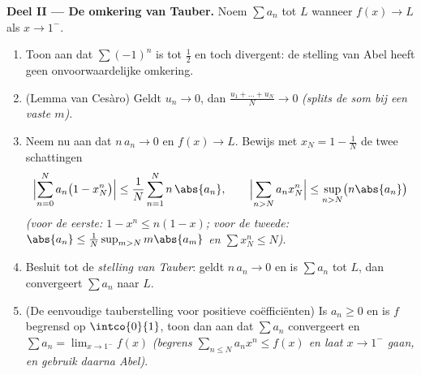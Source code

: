 \begin{problem}
\medskip
\noindent\textbf{Deel II --- De omkering van Tauber.} Noem $\sum
a_n$ \emph{} tot $L$ wanneer $f(x) \to L$ als $x
\to 1^-$.
\begin{enumerate}[resume]
  \item Toon aan dat $\sum (-1)^n$  is tot
        $\frac12$ en toch divergent: de stelling van Abel heeft
        geen onvoorwaardelijke omkering.
  \item (Lemma van Cesàro) Geldt $u_n \to 0$, dan $\frac{u_1 +
        \dots + u_N}{N} \to 0$ \emph{(splits de som bij een vaste
        $m$)}.
  \item Neem nu aan dat $n\,a_n \to 0$ en $f(x) \to L$. Bewijs met
        $x_N = 1 - \frac1N$ de twee schattingen
        \[
        \Bigl|\sum_{n=0}^{N} a_n\bigl(1 - x_N^n\bigr)\Bigr|
        \leq \frac{1}{N}\sum_{n=1}^{N} n\,\abs{a_n},
        \qquad
        \Bigl|\sum_{n>N} a_n x_N^n\Bigr|
        \leq \sup_{n>N}\bigl(n\abs{a_n}\bigr)
        \]
        \emph{(voor de eerste: $1 - x^n \leq n(1-x)$; voor de
        tweede: $\abs{a_n} \leq \frac{1}{N}\sup_{m>N} m\abs{a_m}$
        en $\sum x_N^n \leq N$)}.
  \item Besluit tot de \emph{stelling van Tauber}: geldt $n\,a_n
        \to 0$ en is $\sum a_n$  tot $L$, dan
        convergeert $\sum a_n$ naar $L$.
  \item (De eenvoudige tauberstelling voor positieve
        coëfficiënten) Is $a_n \geq 0$ en is $f$ begrensd op
        $\intco{0}{1}$, toon dan aan dat $\sum a_n$ convergeert en
        $\sum a_n = \lim_{x\to1^-} f(x)$ \emph{(begrens
        $\sum_{n\leq N}a_nx^n \leq f(x)$ en laat $x \to 1^-$
        gaan, en gebruik daarna Abel)}.
\end{enumerate}


\end{problem}
